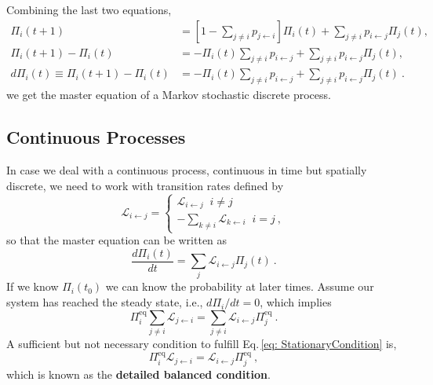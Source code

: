 Combining the last two equations,
\begin{align}
    \Pi_{i}(t+1) &= \left[1 - \sum_{j\neq i}p_{j \leftarrow i}\right]\Pi_{i}(t) + \sum_{j\neq i}p_{i \leftarrow j}\Pi_{j}(t),\\
    \Pi_{i}(t+1) - \Pi_{i}(t) &= -\Pi_{i}(t) \sum_{j \neq i}p_{i \leftarrow j} + \sum_{j \neq i} p_{i \leftarrow j}\Pi_{j}(t), \\
    \label{eq: MasterEquationDiscrete}
    d\Pi_{i}(t) \equiv \Pi_{i}(t+1) - \Pi_{i}(t) &=  -\Pi_{i}(t) \sum_{j \neq i}p_{i \leftarrow j} + \sum_{j \neq i} p_{i \leftarrow j}\Pi_{j}(t)\ .
\end{align}
we get the master equation of a Markov stochastic discrete process.
\subsection{Continuous Processes}
In case we deal with a continuous process, continuous in time but spatially discrete, we need to work with transition rates defined by
\begin{equation}
    \mathcal{L}_{i \leftarrow j} = 
    \begin{cases}
    \mathcal{L}_{i \leftarrow j} \;\; i\neq j\\
    -\sum_{k\neq i}\mathcal{L}_{k \leftarrow i} \;\; i = j\ ,
    \end{cases}
\end{equation}
so that the master equation can be written as
\begin{equation}
\label{eq: MasterEquationContinuous}
    \frac{d\Pi_{i}(t)}{dt} = \sum_{j}\mathcal{L}_{i \leftarrow j} \Pi_{j}(t)\ .
\end{equation}
If we know $\Pi_{i}(t_{0})$ we can know the probability at later times. Assume our system has reached the steady state, i.e., $d\Pi_{i}/dt = 0$, which implies
\begin{equation}
\label{eq: StationaryCondition}
    \Pi_{i}^{\mathrm{eq}} \sum_{j\neq i} \mathcal{L}_{j \leftarrow i} = \sum_{j \neq i}\mathcal{L}_{i \leftarrow j}\Pi_{j}^{\mathrm{eq}}\ .
\end{equation}
A sufficient but not necessary condition to fulfill Eq.\,\eqref{eq: StationaryCondition} is,
\begin{equation}
    \Pi_{i}^{\mathrm{eq}}\mathcal{L}_{j \leftarrow i} = \mathcal{L}_{i \leftarrow j}\Pi_{j}^{\mathrm{eq}}\ , 
\end{equation}
which is known as the \textbf{detailed balanced condition}.\\
